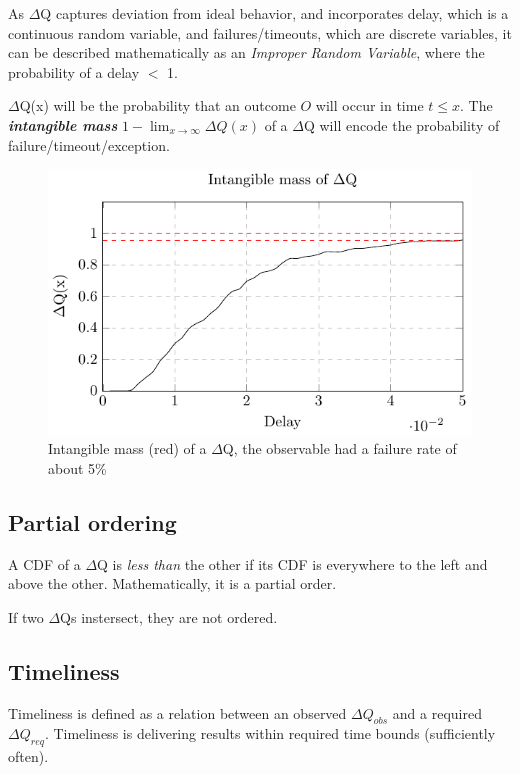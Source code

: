     As $\Delta$Q captures deviation from ideal behavior, and incorporates delay, which is a continuous random variable, and failures/timeouts, which are discrete variables, it can be described mathematically as an \textit{Improper Random Variable}, where the probability of a delay $<$ 1.

    $\Delta$Q(x) will be the probability that an outcome $O$ will occur in time $t \le x$. The \textbf{\textit{intangible mass}} $1 - \lim_{x\to\infty}\Delta Q(x)$ of a $\Delta$Q will encode the probability of failure/timeout/exception.
    
    \begin{figure}[H]
        \begin{center}
            \includegraphics{tikz/intangible.pdf}
        \end{center}
        \caption{Intangible mass (red) of a $\Delta$Q, the observable had a failure rate of about 5\% }
    \end{figure}
    
    \subsection{Partial ordering}
        A CDF of a $\Delta$Q is \textit{less than} the other if its CDF is everywhere to the left and above the other. Mathematically, it is a partial order. 
        
        If two $\Delta$Qs instersect, they are not ordered.

    \subsection{Timeliness}
        Timeliness is defined as a relation between an observed $\Delta Q_{obs}$ and a required $\Delta Q_{req}$. Timeliness is delivering results within required time bounds (sufficiently often).
     
